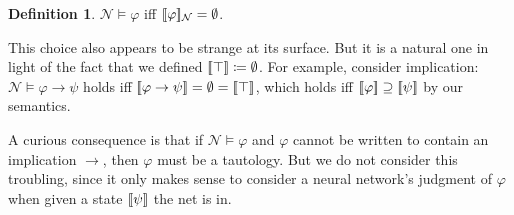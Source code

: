 \documentclass[letterpaper]{article}
\theoremstyle{definition}
\newtheorem{definition}{Definition}
\newcommand{\semantics}[1]{[\![\mbox{\em $ #1 $\/}]\!]}
\newcommand{\Net}{\mathcal{N}}
\begin{document}
\begin{definition}
$\Net \models \varphi$ iff $\semantics{\varphi}_\Net = \emptyset$.
\end{definition}

This choice also appears to be strange at its surface.  But it is a natural one in light of the fact that we defined $\semantics{\top} \coloneqq \emptyset$.  For example, consider implication: $\Net \models \varphi \to \psi$ holds iff $\semantics{\varphi \to \psi} = \emptyset = \semantics{\top}$, which holds iff $\semantics{\varphi} \supseteq \semantics{\psi}$ by our semantics.

A curious consequence is that if $\Net \models \varphi$ and $\varphi$ cannot be written to contain an implication $\to$, then $\varphi$ must be a tautology.  But we do not consider this troubling, since it only makes sense to consider a neural network's judgment of $\varphi$ when given a state $\semantics{\psi}$ the net is in.
\end{document}

